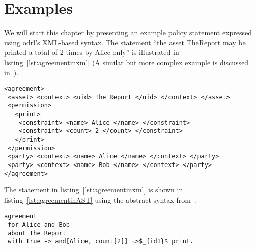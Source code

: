 \chapter{Examples}

We will start this chapter by presenting an example policy statement expressed using \ac{odrl}'s XML-based syntax. The statement ``the asset TheReport may be printed a total of 2 times by Alice only'' is illustrated in listing~\ref{lst:agreementinxml} (A similar but more complex example is discussed in~\cite{pucella2006}). 


\lstset{language=XML}
\begin{lstlisting}[caption={First Agreement for Alice and Bob in XML},label={lst:agreementinxml}]
<agreement>
 <asset> <context> <uid> The Report </uid> </context> </asset>
 <permission>
   <print>
    <constraint> <name> Alice </name> </constraint>
    <constraint> <count> 2 </count> </constraint>
   </print>
 </permission>
 <party> <context> <name> Alice </name> </context> </party>
 <party> <context> <name> Bob </name> </context> </party>
</agreement>
\end{lstlisting}

The statement in listing~\ref{lst:agreementinxml} is shown in listing~\ref{lst:agreementinAST} using the abstract syntax from~\cite{pucella2006}.

\lstset{language=Pucella2006}
\begin{lstlisting}[frame=single, caption={First Agreement for Alice and Bob},label={lst:agreementinAST}, mathescape]
agreement
 for Alice and Bob 
 about The Report 
 with True -> and[Alice, count[2]] =>$_{id1}$ print.
\end{lstlisting}


